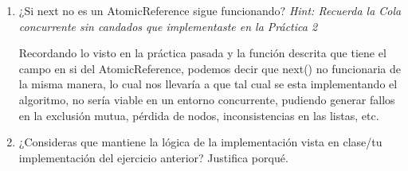 \begin{enumerate}
\begin{enumerate}
        \item ¿Si next no es un AtomicReference sigue funcionando? \textit{Hint: Recuerda la Cola concurrente sin candados que implementaste en la Práctica 2}

        Recordando lo visto en la práctica pasada y la función descrita que tiene el campo en si del AtomicReference, podemos decir que next() no funcionaria de la misma manera, lo cual nos llevaría a que tal cual se esta implementando el algoritmo, no sería viable en un entorno concurrente, pudiendo generar fallos en la exclusión mutua, pérdida de nodos, inconsistencias en las listas, etc.\\

        \item ¿Consideras que mantiene la lógica de la implementación vista en clase/tu implementación del ejercicio anterior? Justifica porqué.

        
    \end{enumerate}
\end{enumerate}
